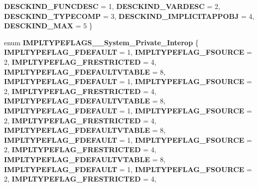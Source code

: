 \begin{DoxyCompactItemize}
{\bfseries D\+E\+S\+C\+K\+I\+N\+D\+\_\+\+F\+U\+N\+C\+D\+E\+SC} = 1, 
{\bfseries D\+E\+S\+C\+K\+I\+N\+D\+\_\+\+V\+A\+R\+D\+E\+SC} = 2, 
{\bfseries D\+E\+S\+C\+K\+I\+N\+D\+\_\+\+T\+Y\+P\+E\+C\+O\+MP} = 3, 
\newline
{\bfseries D\+E\+S\+C\+K\+I\+N\+D\+\_\+\+I\+M\+P\+L\+I\+C\+I\+T\+A\+P\+P\+O\+BJ} = 4, 
{\bfseries D\+E\+S\+C\+K\+I\+N\+D\+\_\+\+M\+AX} = 5
 \}
\item 
\mbox{\label{namespace_system_1_1_runtime_1_1_interop_services_1_1_com_types_a1931ab75a38fde1eb6268b4b419ffec5}} 
enum {\bfseries I\+M\+P\+L\+T\+Y\+P\+E\+F\+L\+A\+G\+S\+\_\+\+\_\+\+System\+\_\+\+Private\+\_\+\+Interop} \{ \newline
{\bfseries I\+M\+P\+L\+T\+Y\+P\+E\+F\+L\+A\+G\+\_\+\+F\+D\+E\+F\+A\+U\+LT} = 1, 
{\bfseries I\+M\+P\+L\+T\+Y\+P\+E\+F\+L\+A\+G\+\_\+\+F\+S\+O\+U\+R\+CE} = 2, 
{\bfseries I\+M\+P\+L\+T\+Y\+P\+E\+F\+L\+A\+G\+\_\+\+F\+R\+E\+S\+T\+R\+I\+C\+T\+ED} = 4, 
{\bfseries I\+M\+P\+L\+T\+Y\+P\+E\+F\+L\+A\+G\+\_\+\+F\+D\+E\+F\+A\+U\+L\+T\+V\+T\+A\+B\+LE} = 8, 
\newline
{\bfseries I\+M\+P\+L\+T\+Y\+P\+E\+F\+L\+A\+G\+\_\+\+F\+D\+E\+F\+A\+U\+LT} = 1, 
{\bfseries I\+M\+P\+L\+T\+Y\+P\+E\+F\+L\+A\+G\+\_\+\+F\+S\+O\+U\+R\+CE} = 2, 
{\bfseries I\+M\+P\+L\+T\+Y\+P\+E\+F\+L\+A\+G\+\_\+\+F\+R\+E\+S\+T\+R\+I\+C\+T\+ED} = 4, 
{\bfseries I\+M\+P\+L\+T\+Y\+P\+E\+F\+L\+A\+G\+\_\+\+F\+D\+E\+F\+A\+U\+L\+T\+V\+T\+A\+B\+LE} = 8, 
\newline
{\bfseries I\+M\+P\+L\+T\+Y\+P\+E\+F\+L\+A\+G\+\_\+\+F\+D\+E\+F\+A\+U\+LT} = 1, 
{\bfseries I\+M\+P\+L\+T\+Y\+P\+E\+F\+L\+A\+G\+\_\+\+F\+S\+O\+U\+R\+CE} = 2, 
{\bfseries I\+M\+P\+L\+T\+Y\+P\+E\+F\+L\+A\+G\+\_\+\+F\+R\+E\+S\+T\+R\+I\+C\+T\+ED} = 4, 
{\bfseries I\+M\+P\+L\+T\+Y\+P\+E\+F\+L\+A\+G\+\_\+\+F\+D\+E\+F\+A\+U\+L\+T\+V\+T\+A\+B\+LE} = 8, 
\newline
{\bfseries I\+M\+P\+L\+T\+Y\+P\+E\+F\+L\+A\+G\+\_\+\+F\+D\+E\+F\+A\+U\+LT} = 1, 
{\bfseries I\+M\+P\+L\+T\+Y\+P\+E\+F\+L\+A\+G\+\_\+\+F\+S\+O\+U\+R\+CE} = 2, 
{\bfseries I\+M\+P\+L\+T\+Y\+P\+E\+F\+L\+A\+G\+\_\+\+F\+R\+E\+S\+T\+R\+I\+C\+T\+ED} = 4, 
{\bfseries I\+M\+P\+L\+T\+Y\+P\+E\+F\+L\+A\+G\+\_\+\+F\+D\+E\+F\+A\+U\+L\+T\+V\+T\+A\+B\+LE} = 8, 
\newline
{\bfseries I\+M\+P\+L\+T\+Y\+P\+E\+F\+L\+A\+G\+\_\+\+F\+D\+E\+F\+A\+U\+LT} = 1, 
{\bfseries I\+M\+P\+L\+T\+Y\+P\+E\+F\+L\+A\+G\+\_\+\+F\+S\+O\+U\+R\+CE} = 2, 
{\bfseries I\+M\+P\+L\+T\+Y\+P\+E\+F\+L\+A\+G\+\_\+\+F\+R\+E\+S\+T\+R\+I\+C\+T\+ED} = 4, 

\end{DoxyCompactItemize}
